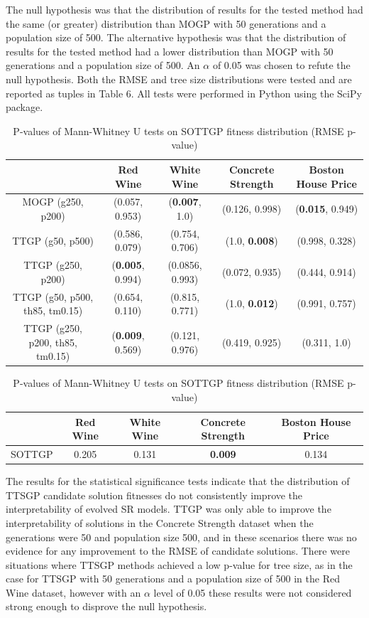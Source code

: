 \documentclass[a4paper, twocolumn]{article}
\begin{document}
The null hypothesis was that the distribution of results for the tested method had the same (or greater) distribution than MOGP with 50 generations and a population size of 500. The alternative hypothesis was that the distribution of results for the tested method had a lower distribution than MOGP with 50 generations and a population size of 500. An $\alpha$ of 0.05 was chosen to refute the null hypothesis. Both the RMSE and tree size distributions were tested and are reported as tuples in Table 6. All tests were performed in Python using the SciPy package.
\begin{table}[ht]
	\begin{center}
		\caption{P-values of Mann-Whitney U tests on solution fitness distribution (RMSE p-value, tree size p-value)}
		\label{table:5}
		\begin{tabular}{ c|cccc }
			& Red Wine & White Wine & Concrete Strength & Boston House Price\\
			\hline
			MOGP (g250, p200) &(0.057, 0.953)&(\textbf{0.007}, 1.0)&(0.126, 0.998)&(\textbf{0.015}, 0.949)\\
			TTGP (g50, p500) &(0.586, 0.079)&(0.754, 0.706)&(1.0, \textbf{0.008})&(0.998, 0.328)\\
			TTGP (g250, p200) &(\textbf{0.005}, 0.994)&(0.0856, 0.993)&(0.072, 0.935)&(0.444, 0.914)\\
			TTGP (g50, p500, th85, tm0.15) &(0.654, 0.110)&(0.815, 0.771)&(1.0, \textbf{0.012})&(0.991, 0.757)\\
			TTGP (g250, p200, th85, tm0.15) &(\textbf{0.009}, 0.569)&(0.121, 0.976)&(0.419, 0.925)&(0.311, 1.0)\\
		\end{tabular}
	\end{center}
	\begin{center}
		\caption{P-values of Mann-Whitney U tests on SOTTGP fitness distribution (RMSE p-value)}
		\label{table:6}
		\begin{tabular}{ c|cccc }
			& Red Wine & White Wine & Concrete Strength & Boston House Price\\
			\hline
			SOTTGP&0.205&0.131&\textbf{0.009}&0.134\\
		\end{tabular}
	\end{center}
\end{table}

The results for the statistical significance tests indicate that the distribution of TTSGP candidate solution fitnesses do not consistently improve the interpretability of evolved SR models. TTGP was only able to improve the interpretability of solutions in the Concrete Strength dataset when the generations were 50 and population size 500, and in these scenarios there was no evidence for any improvement to the RMSE of candidate solutions. There were situations where TTSGP methods achieved a low p-value for tree size, as in the case for TTSGP with 50 generations and a population size of 500 in the Red Wine dataset, however with an $\alpha$ level of 0.05 these results were not considered strong enough to disprove the null hypothesis.
\end{document}
